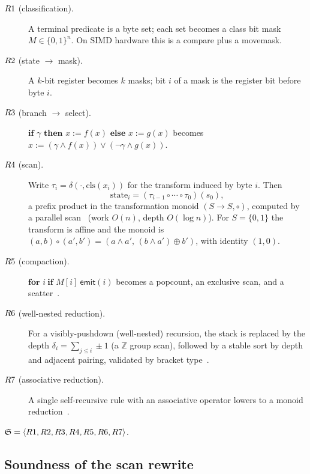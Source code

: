 \begin{description}
  \item[$R1$ (classification).]  A terminal predicate is a byte set; each set
    becomes a class bit mask $M \in \{0,1\}^n$.  On SIMD hardware this is a
    compare plus a movemask.
  \item[$R2$ (state $\to$ mask).]  A $k$-bit register becomes $k$ masks; bit
    $i$ of a mask is the register bit before byte $i$.
  \item[$R3$ (branch $\to$ select).]
    $\textbf{if }\gamma\textbf{ then }x:=f(x)\textbf{ else }x:=g(x)$ becomes
    $x := (\gamma\wedge f(x))\vee(\neg\gamma\wedge g(x))$.
  \item[$R4$ (scan).]  Write $\tau_i = \delta(\cdot,\mathrm{cls}(x_i))$ for
    the transform induced by byte $i$.  Then
    \[
      \text{state}_i = (\tau_{i-1}\circ\cdots\circ\tau_0)(s_0),
    \]
    a prefix product in the transformation monoid $(S\to S,\circ)$, computed by
    a parallel scan~\cite{blelloch,ladnerfischer,hillissteele,sengupta}
    (work $O(n)$, depth $O(\log n)$).  For $S=\{0,1\}$ the
    transform is affine and the monoid is
    $(a,b)\circ(a',b')=(a\wedge a',\,(b\wedge a')\oplus b')$, with identity
    $(1,0)$.
  \item[$R5$ (compaction).]  $\textbf{for }i\ \textbf{if }M[i]\
    \mathsf{emit}(i)$ becomes a popcount, an exclusive scan, and a
    scatter~\cite{sengupta}.
  \item[$R6$ (well-nested reduction).]  For a visibly-pushdown (well-nested)
    recursion, the stack is replaced by the depth
    $\delta_i = \sum_{j\le i} \pm1$ (a $\mathbb{Z}$ group scan), followed by a
    stable sort by depth and adjacent pairing, validated by bracket
    type~\cite{alur,stackmonoid,baronvishkin,millerreif}.
  \item[$R7$ (associative reduction).]  A single self-recursive rule with
    an associative operator lowers to a monoid
    reduction~\cite{birdlists,birddemoor,meertens}.
\end{description}

\begin{definition}
\label{def:M}
$\mathfrak{S} = \langle R1,R2,R3,R4,R5,R6,R7\rangle$.
\end{definition}

\subsection{Soundness of the scan rewrite}
\label{sec:soundness}

